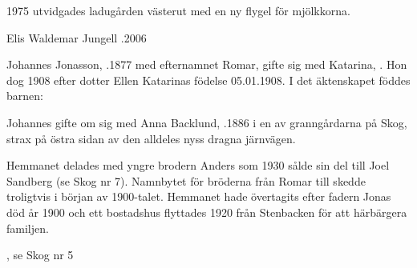 1975 utvidgades ladugården västerut med en ny flygel för mjölkkorna.

\begin{jhchildren}
  \item {}
  \item {}
\end{jhchildren}

Elis Waldemar Jungell .2006






Johannes Jonasson, .1877 med efternamnet Romar, gifte sig med Katarina, . Hon dog 1908 efter dotter Ellen Katarinas födelse 05.01.1908. I det äktenskapet föddes barnen:

\begin{jhchildren}
  \item {}
  \item {}
  \item {}
\end{jhchildren}

Johannes gifte om sig med Anna Backlund, .1886 i en av granngårdarna på Skog, strax på östra sidan av den alldeles nyss dragna järnvägen.

Hemmanet delades med yngre brodern Anders som 1930 sålde sin del till Joel Sandberg (se Skog nr 7). Namnbytet för bröderna från Romar till  skedde troligtvis i början av 1900-talet. Hemmanet hade övertagits efter fadern Jonas död år 1900 och ett bostadshus flyttades 1920 från Stenbacken för att härbärgera familjen.

\begin{jhchildren}
  \item {}, se Skog nr 5
  \item {}
  \item {}
  \item {}
\end{jhchildren}

